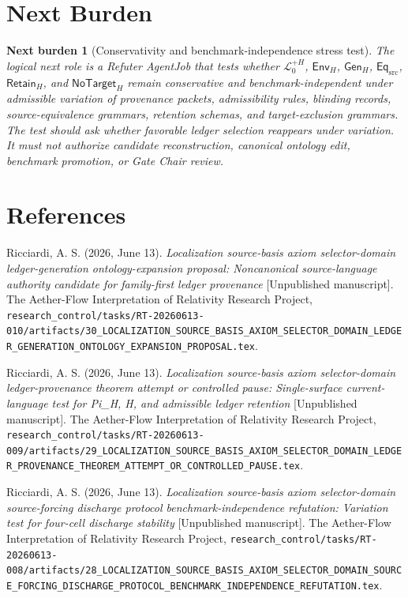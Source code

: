 \documentclass[11pt]{article}
\newcommand{\LangPlus}{\mathcal{L}_{0}^{+H}}
\newcommand{\GenH}{\mathsf{Gen}_{H}}
\newcommand{\EnvH}{\mathsf{Env}_{H}}
\newcommand{\EqSrc}{\mathsf{Eq}_{\mathrm{src}}}
\newcommand{\RetainH}{\mathsf{Retain}_{H}}
\newcommand{\NoTargetH}{\mathsf{NoTarget}_{H}}
\newtheorem{nextburden}{Next burden}
\begin{document}
\section{Next Burden}

\begin{nextburden}[Conservativity and benchmark-independence stress test]
The logical next role is a Refuter AgentJob that tests whether
\(\LangPlus\), \(\EnvH\), \(\GenH\), \(\EqSrc\), \(\RetainH\), and
\(\NoTargetH\) remain conservative and benchmark-independent under
admissible variation of provenance packets, admissibility rules, blinding
records, source-equivalence grammars, retention schemas, and target-exclusion
grammars. The test should ask whether favorable ledger selection reappears
under variation. It must not authorize candidate reconstruction, canonical
ontology edit, benchmark promotion, or Gate Chair review.
\end{nextburden}

\section*{References}

Ricciardi, A. S. (2026, June 13). \emph{Localization source-basis axiom
selector-domain ledger-generation ontology-expansion proposal: Noncanonical
source-language authority candidate for family-first ledger provenance}
[Unpublished manuscript]. The Aether-Flow Interpretation of Relativity
Research Project,
\texttt{research\_control/tasks/RT-20260613-010/artifacts/30\_LOCALIZATION\_SOURCE\_BASIS\_AXIOM\_SELECTOR\_DOMAIN\_LEDGER\_GENERATION\_ONTOLOGY\_EXPANSION\_PROPOSAL.tex}.

Ricciardi, A. S. (2026, June 13). \emph{Localization source-basis axiom
selector-domain ledger-provenance theorem attempt or controlled pause:
Single-surface current-language test for Pi\_H, H, and admissible ledger
retention} [Unpublished manuscript]. The Aether-Flow Interpretation of
Relativity Research Project,
\texttt{research\_control/tasks/RT-20260613-009/artifacts/29\_LOCALIZATION\_SOURCE\_BASIS\_AXIOM\_SELECTOR\_DOMAIN\_LEDGER\_PROVENANCE\_THEOREM\_ATTEMPT\_OR\_CONTROLLED\_PAUSE.tex}.

Ricciardi, A. S. (2026, June 13). \emph{Localization source-basis axiom
selector-domain source-forcing discharge protocol benchmark-independence
refutation: Variation test for four-cell discharge stability} [Unpublished
manuscript]. The Aether-Flow Interpretation of Relativity Research Project,
\texttt{research\_control/tasks/RT-20260613-008/artifacts/28\_LOCALIZATION\_SOURCE\_BASIS\_AXIOM\_SELECTOR\_DOMAIN\_SOURCE\_FORCING\_DISCHARGE\_PROTOCOL\_BENCHMARK\_INDEPENDENCE\_REFUTATION.tex}.
\end{document}
